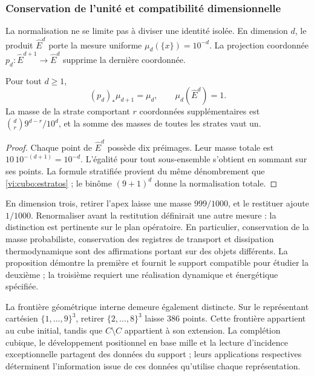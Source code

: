 

\subsubsection{Conservation de l'unité et compatibilité dimensionnelle}

La normalisation ne se limite pas à diviser une identité isolée. En dimension
\(d\), le produit \(\widehat E^d\) porte la mesure uniforme
\(\mu_d(\{x\})=10^{-d}\). La projection coordonnée
\(p_d:\widehat E^{d+1}\to\widehat E^d\) supprime la dernière coordonnée.

\begin{proposition}
Pour tout \(d\geq1\),
\[
 (p_d)_*\mu_{d+1}=\mu_d,
 \qquad \mu_d(\widehat E^d)=1.
\]
La masse de la strate comportant \(r\) coordonnées supplémentaires est
\(\binom dr9^{d-r}/10^d\), et la somme des masses de toutes les strates
vaut un.
\end{proposition}
\begin{proof}
Chaque point de \(\widehat E^d\) possède dix préimages. Leur masse totale est
\(10\,10^{-(d+1)}=10^{-d}\). L'égalité pour tout sous-ensemble
s'obtient en sommant sur ses points. La formule stratifiée provient
du même dénombrement que \eqref{vi:cubo:estratos} ; le binôme
\((9+1)^d\) donne la normalisation totale.
\end{proof}

En dimension trois, retirer l'apex laisse une masse \(999/1000\), et
le restituer ajoute \(1/1000\). Renormaliser avant la restitution
définirait une autre mesure : la distinction est pertinente sur le plan opératoire.
En particulier, conservation de la masse probabiliste, conservation des
registres de transport et dissipation thermodynamique sont des affirmations portant sur
des objets différents. La proposition démontre la première et fournit le
support compatible pour étudier la deuxième ; la troisième requiert une
réalisation dynamique et énergétique spécifiée.

La frontière géométrique interne demeure également distincte.
Sur le représentant cartésien \(\{1,\ldots,9\}^3\), retirer
\(\{2,\ldots,8\}^3\) laisse \(386\) points. Cette frontière appartient au
cube initial, tandis que \(\widehat C\setminus C\) appartient à son
extension. La complétion cubique, le développement positionnel en base mille et
la lecture d'incidence exceptionnelle partagent des données du support ;
leurs applications respectives déterminent l'information issue de ces données qu'utilise
chaque représentation.

